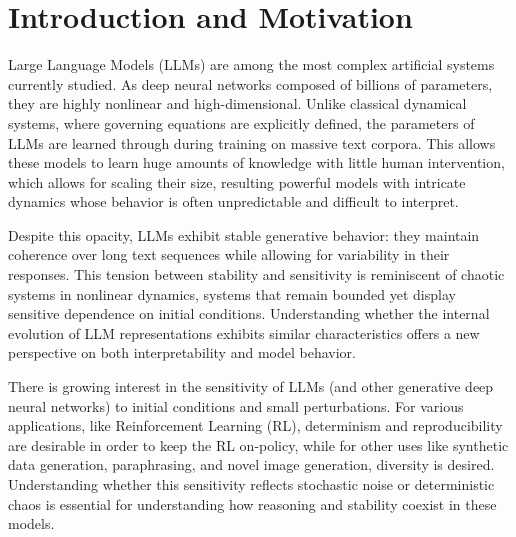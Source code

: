 \documentclass[a4paper,12pt]{article}
\begin{document}
\section{Introduction and Motivation}
\label{sec:introduction}
Large Language Models (LLMs) are among the most complex artificial systems currently studied. As deep neural networks composed of billions of parameters, they are highly nonlinear and high-dimensional. Unlike classical dynamical systems, where governing equations are explicitly defined, the parameters of LLMs are learned through during training on massive text corpora. This allows these models to learn huge amounts of knowledge with little human intervention, which allows for scaling their size, resulting powerful models with intricate dynamics whose behavior is often unpredictable and difficult to interpret.

Despite this opacity, LLMs exhibit stable generative behavior: they maintain coherence over long text sequences while allowing for variability in their responses. This tension between stability and sensitivity is reminiscent of chaotic systems in nonlinear dynamics, systems that remain bounded yet display sensitive dependence on initial conditions. Understanding whether the internal evolution of LLM representations exhibits similar characteristics offers a new perspective on both interpretability and model behavior.

There is growing interest in the sensitivity of LLMs (and other generative deep neural networks) to initial conditions and small perturbations. For various applications, like Reinforcement Learning (RL), determinism and reproducibility are desirable in order to keep the RL on-policy, while for other uses like synthetic data generation, paraphrasing, and novel image generation, diversity is desired. Understanding whether this sensitivity reflects stochastic noise or deterministic chaos is essential for understanding how reasoning and stability coexist in these models.
\end{document}
